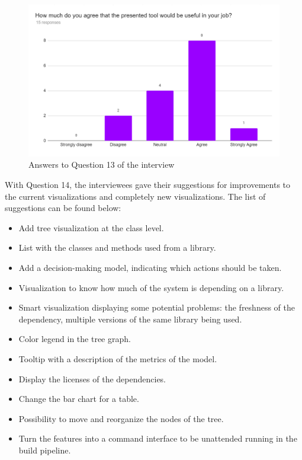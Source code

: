 \begin{figure}[ht!]
\begin{center}
\includegraphics[width=\textwidth]{figures/interview/Question13.png}
\caption{Answers to Question 13 of the interview}
\label{fig:interview-13}
\end{center}
\end{figure}

With Question 14, the interviewees gave their suggestions for improvements to the current visualizations and completely new visualizations. The list of suggestions can be found below:

\begin{itemize}
  \item Add tree visualization at the class level.
  \item List with the classes and methods used from a library.
  \item Add a decision-making model, indicating which actions should be taken.
  \item Visualization to know how much of the system is depending on a library.
  \item Smart visualization displaying some potential problems: the freshness of the dependency, multiple versions of the same library being used.
  \item Color legend in the tree graph.
  \item Tooltip with a description of the metrics of the model.
  \item Display the licenses of the dependencies.
  \item Change the bar chart for a table.
  \item Possibility to move and reorganize the nodes of the tree.
  \item Turn the features into a command interface to be unattended running in the build pipeline.
\end{itemize}

